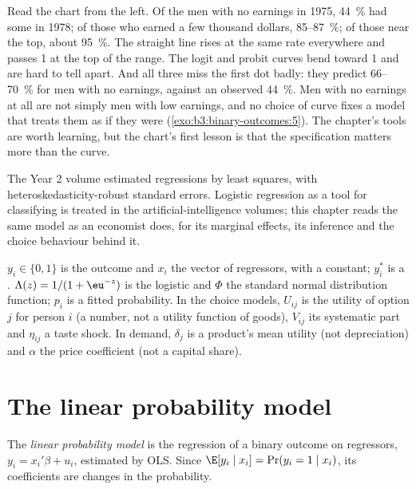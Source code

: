 Read the chart from the left. Of the men with no earnings in 1975, 44~\% had some
in 1978; of those who earned a few thousand dollars, 85--87~\%; of those near
the top, about 95~\%. %
The straight line rises at the same rate everywhere and passes 1 at the top
of the range. The logit and probit curves bend toward 1 and are hard to tell
apart. And all three miss the first dot badly: they predict 66--70~\% for men
with no earnings, %
against an observed 44~\%. Men with no earnings at all are not simply men with
low earnings, and no choice of curve fixes a model that treats them as if they
were (\cref{exo:b3:binary-outcomes:5}). The chapter's tools are worth
learning, but the chart's first lesson is that the specification matters more
than the curve.

\begin{recall}
The Year 2 volume estimated regressions by least squares, with
heteroskedasticity-robust standard errors. Logistic regression as a tool for
classifying is treated in the artificial-intelligence volumes; this chapter
reads the same model as an economist does, for its marginal effects, its
inference and the choice behaviour behind it.
\end{recall}

\begin{notation}\label{not:b3:binary-outcomes:symbols}
$y_i \in \{0, 1\}$ is the outcome and $x_i$ the vector of regressors, with a
constant; $y_i^*$ is a . $\Lambda(z) = 1/(1 + \eu^{-z})$ is the
logistic and $\Phi$ the standard normal distribution function; $p_i$ is a
fitted probability. In the choice models, $U_{ij}$ is the utility of option
$j$ for person $i$ (a number, not a utility function of goods), $V_{ij}$ its
systematic part and $\eta_{ij}$ a taste shock. In demand, $\delta_j$ is a
product's mean utility (not depreciation) and $\alpha$ the price coefficient
(not a capital share).
\end{notation}

\section{The linear probability model}\label{sec:b3:binary-outcomes:lpm}

\begin{definition}\label{def:b3:binary-outcomes:lpm}
The \emph{linear probability model} is the regression of a binary outcome on
regressors, $y_i = x_i'\beta + u_i$, estimated by OLS. Since $\E[y_i \mid x_i] =
\Pr(y_i = 1 \mid x_i)$, its coefficients are changes in the probability.
\end{definition}

